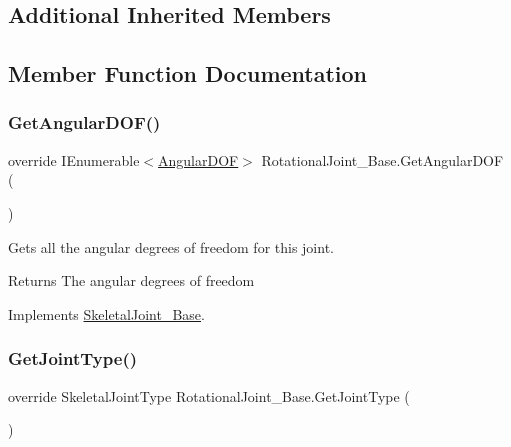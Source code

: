 \subsection*{Additional Inherited Members}


\subsection{Member Function Documentation}
\mbox{\label{class_rotational_joint___base_aead83dd768acf451c3761f49e393cc35}} 
\subsubsection{\texorpdfstring{Get\+Angular\+D\+O\+F()}{GetAngularDOF()}}
{\footnotesize\ttfamily override I\+Enumerable$<$\hyperlink{interface_angular_d_o_f}{Angular\+D\+OF}$>$ Rotational\+Joint\+\_\+\+Base.\+Get\+Angular\+D\+OF (\begin{DoxyParamCaption}{ }\end{DoxyParamCaption})\hspace{0.3cm}{\ttfamily [virtual]}}



Gets all the angular degrees of freedom for this joint. 

\begin{DoxyReturn}{Returns}
The angular degrees of freedom
\end{DoxyReturn}


Implements \hyperlink{class_skeletal_joint___base_abf96267052733ccf001e0b092c6582f8}{Skeletal\+Joint\+\_\+\+Base}.

\mbox{\label{class_rotational_joint___base_a58b8ae858b3f342302b5a28412ecac6b}} 
\subsubsection{\texorpdfstring{Get\+Joint\+Type()}{GetJointType()}}
{\footnotesize\ttfamily override Skeletal\+Joint\+Type Rotational\+Joint\+\_\+\+Base.\+Get\+Joint\+Type (\begin{DoxyParamCaption}{ }\end{DoxyParamCaption})\hspace{0.3cm}{\ttfamily [virtual]}}




